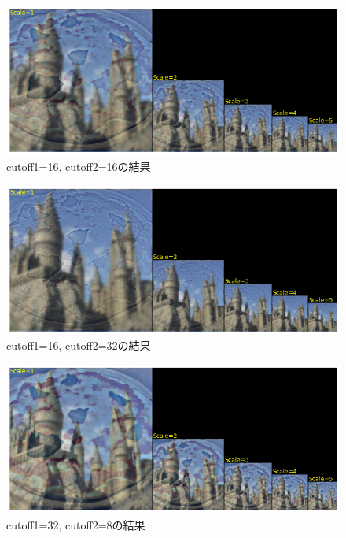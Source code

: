 \documentclass[12pt]{jarticle}
\begin{document}
\begin{figure}[h]
    \begin{center}
        \includegraphics[scale=0.7]{kadai4_3_12.png}
    \end{center}
    \caption{cutoff1=16, cutoff2=16の結果}
\end{figure}

\clearpage
\begin{figure}[h]
    \begin{center}
        \includegraphics[scale=0.7]{kadai4_3_13.png}
    \end{center}
    \caption{cutoff1=16, cutoff2=32の結果}
\end{figure}

\begin{figure}[h]
    \begin{center}
        \includegraphics[scale=0.7]{kadai4_3_14.png}
    \end{center}
    \caption{cutoff1=32, cutoff2=8の結果}
\end{figure}
\end{document}
